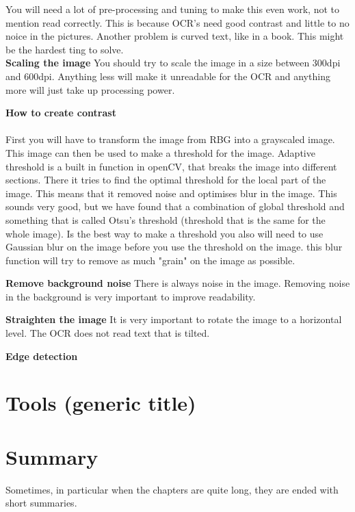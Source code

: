 You will need a lot of pre-processing and tuning to make this even work, not to mention read correctly.
This is because OCR's need good contrast and little to no noice in the pictures.
Another problem is curved text, like in a book.
This might be the hardest ting to solve.
\\
\textbf{Scaling the image}
You should try to scale the image in a size between 300dpi and 600dpi.
Anything less will make it unreadable for the OCR and anything more will just take up processing power.

\textbf{How to create contrast}
\\\\

First you will have to transform the image from RBG into a grayscaled image.
This image can then be used to make a threshold for the image.
Adaptive threshold is a built in function in openCV, that breaks the image into different sections.
There it tries to find the optimal threshold for the local part of the image.
This means that it removed noise and optimises blur in the image.
This sounds very good, but we have found that a combination of global threshold and something that is called Otsu's threshold (threshold that is the same for the whole image).
Is the best way to make a threshold you also will need to use Gaussian blur on the image before you use the threshold on the image.
this blur function will try to remove as much "grain" on the image as possible.

\textbf{Remove background noise}
There is always noise in the image.
Removing noise in the background is very important to improve readability.

\textbf{Straighten the image}
It is very important to rotate the image to a horizontal level.
The OCR does not read text that is tilted.

\textbf{Edge detection}


\section{Tools (generic title)}\label{sec:tools-(generic-title)}

\section{Summary}\label{sec:summary}

Sometimes, in particular when the chapters are quite long, they are ended with short summaries.
